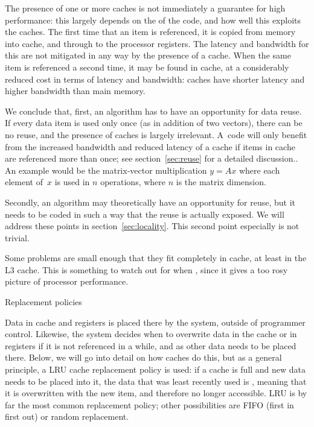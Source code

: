 The presence of one or more caches is not immediately a guarantee for
high performance: this largely depends on the  of the code, and how well this exploits the caches.
The first time that an item is
referenced, it is copied from memory into cache, and through to the
processor registers. The latency and bandwidth for this are not mitigated in any
way by the presence of a cache. When the same item is referenced a
second time, it may be found in cache, at a considerably reduced cost
in terms of latency and bandwidth: caches have shorter latency and
higher bandwidth than main memory.

We conclude that, first, an algorithm has to have an opportunity for
data reuse. If every data item is used only once (as in addition of
two vectors), there can be no reuse, and the presence of caches is
largely irrelevant. A~code will only benefit from the increased
bandwidth and reduced latency of a cache if items in cache are
referenced more than once; see section~\ref{sec:reuse} for a detailed
discussion.. An example would be the matrix-vector multiplication
$y=Ax$ where each element of~$x$ is used in $n$ operations, where $n$
is the matrix dimension.

Secondly, an algorithm may theoretically
have an opportunity for reuse, but it needs to be coded in such a way
that the reuse is actually exposed. We will address these points in
section~\ref{sec:locality}. This second point especially is not
trivial.

Some problems are small enough that they fit completely in cache, at
least in the L3 cache. This is something to watch out for when
, since it gives a too rosy picture of
processor performance.

 {Replacement policies}
\label{sec:lru}

Data in cache and registers is placed there by the system, outside of
programmer control. Likewise, the system decides when to overwrite
data in the cache or in registers if it is not referenced in a while,
and as other data needs to be placed there.  Below, we will go into
detail on how caches do this, but as a general principle, a \acf{LRU}
cache replacement policy is used: if a cache is full and new data
needs to be placed into it, the data that was least recently used is
, meaning that it is overwritten with the new item,
and therefore no longer accessible. LRU is by far the most common
replacement policy; other possibilities are FIFO (first in first out)
or random replacement.

